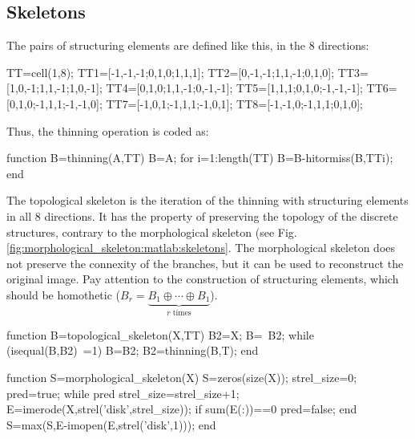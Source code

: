 \subsection{Skeletons}
The pairs of structuring elements are defined like this, in the 8 directions:
\begin{matlab}
TT=cell(1,8);
TT{1}=[-1,-1,-1;0,1,0;1,1,1];
TT{2}=[0,-1,-1;1,1,-1;0,1,0];
TT{3}=[1,0,-1;1,1,-1;1,0,-1];
TT{4}=[0,1,0;1,1,-1;0,-1,-1];
TT{5}=[1,1,1;0,1,0;-1,-1,-1];
TT{6}=[0,1,0;-1,1,1;-1,-1,0];
TT{7}=[-1,0,1;-1,1,1;-1,0,1];
TT{8}=[-1,-1,0;-1,1,1;0,1,0];
\end{matlab}

Thus, the thinning operation is coded as:
\begin{matlab}
function B=thinning(A,TT)
B=A;
for i=1:length(TT)
    B=B-hitormiss(B,TT{i});
end
\end{matlab}

The topological skeleton is the iteration of the thinning with structuring elements in all 8 directions. It has the property of preserving the topology of the discrete structures, contrary to the morphological skeleton (see Fig.\ref{fig:morphological_skeleton:matlab:skeletons}.
The morphological skeleton does not preserve the connexity of the branches, but it can be used to reconstruct the original image. Pay attention to the construction of structuring elements, which should be homothetic ($B_r=\underbrace {B_1\oplus \cdots \oplus B_1}_{{r{\mbox{ times}}}}$).
\begin{matlab}
function B=topological_skeleton(X,TT)
B2=X;
B=~B2;
while (isequal(B,B2)~=1)
    B=B2;
    B2=thinning(B,T);
end
\end{matlab}


\begin{matlab}
function S=morphological_skeleton(X)
S=zeros(size(X));
strel_size=0; %
pred=true;
while pred
    strel_size=strel_size+1;
    E=imerode(X,strel('disk',strel_size));
    if sum(E(:))==0
        pred=false;
    end
    S=max(S,E-imopen(E,strel('disk',1))); 
end
\end{matlab}


